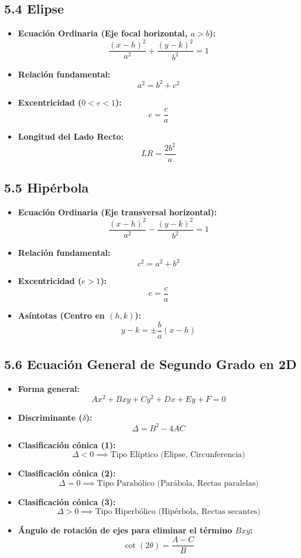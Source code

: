 \documentclass[11pt,a4paper]{article}
\begin{document}
\subsection*{5.4 Elipse}

\begin{itemize}
  \item \textbf{Ecuación Ordinaria (Eje focal horizontal, $a > b$):}
  \[
    \frac{(x - h)^2}{a^2} + \frac{(y - k)^2}{b^2} = 1
  \]
  \item \textbf{Relación fundamental:}
  \[
    a^2 = b^2 + c^2
  \]
  \item \textbf{Excentricidad ($0 < e < 1$):}
  \[
    e = \frac{c}{a}
  \]
  \item \textbf{Longitud del Lado Recto:}
  \[
    LR = \frac{2b^2}{a}
  \]
\end{itemize}

\subsection*{5.5 Hipérbola}

\begin{itemize}
  \item \textbf{Ecuación Ordinaria (Eje transversal horizontal):}
  \[
    \frac{(x - h)^2}{a^2} - \frac{(y - k)^2}{b^2} = 1
  \]
  \item \textbf{Relación fundamental:}
  \[
    c^2 = a^2 + b^2
  \]
  \item \textbf{Excentricidad ($e > 1$):}
  \[
    e = \frac{c}{a}
  \]
  \item \textbf{Asíntotas (Centro en $(h,k)$):}
  \[
    y - k = \pm \frac{b}{a}(x - h)
  \]
\end{itemize}

\subsection*{5.6 Ecuación General de Segundo Grado en 2D}

\begin{itemize}
  \item \textbf{Forma general:}
  \[
    Ax^2 + Bxy + Cy^2 + Dx + Ey + F = 0
  \]
  \item \textbf{Discriminante ($\delta$):}
  \[
    \Delta = B^2 - 4AC
  \]
  \item \textbf{Clasificación cónica (1):}
  \[
    \Delta < 0 \implies \text{Tipo Elíptico (Elipse, Circunferencia)}
  \]
  \item \textbf{Clasificación cónica (2):}
  \[
    \Delta = 0 \implies \text{Tipo Parabólico (Parábola, Rectas paralelas)}
  \]
  \item \textbf{Clasificación cónica (3):}
  \[
    \Delta > 0 \implies \text{Tipo Hiperbólico (Hipérbola, Rectas secantes)}
  \]
  \item \textbf{Ángulo de rotación de ejes para eliminar el término $Bxy$:}
  \[
    \cot(2\theta) = \frac{A - C}{B}
  \]
\end{itemize}
\end{document}
